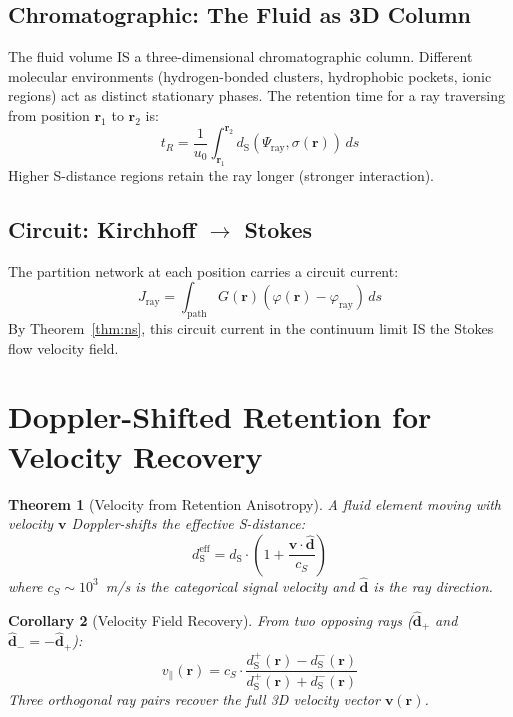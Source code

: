\documentclass[twocolumn,10pt,a4paper]{article}
\theoremstyle{plain}
\newtheorem{theorem}{Theorem}[section]
\newtheorem{corollary}[theorem]{Corollary}
\theoremstyle{definition}
\theoremstyle{remark}
\newcommand{\dS}{d_{\mathrm{S}}}
\begin{document}
\subsection{Chromatographic: The Fluid as 3D Column}

The fluid volume IS a three-dimensional chromatographic column. Different molecular environments (hydrogen-bonded clusters, hydrophobic pockets, ionic regions) act as distinct stationary phases. The retention time for a ray traversing from position $\mathbf{r}_1$ to $\mathbf{r}_2$ is:
\begin{equation}
    t_R = \frac{1}{u_0}\int_{\mathbf{r}_1}^{\mathbf{r}_2} \dS(\Psi_{\mathrm{ray}}, \sigma(\mathbf{r}))\, ds
\end{equation}
Higher S-distance regions retain the ray longer (stronger interaction).

\subsection{Circuit: Kirchhoff $\to$ Stokes}

The partition network at each position carries a circuit current:
\begin{equation}
    J_{\mathrm{ray}} = \int_{\mathrm{path}} G(\mathbf{r})(\varphi(\mathbf{r}) - \varphi_{\mathrm{ray}})\, ds
\end{equation}
By Theorem~\ref{thm:ns}, this circuit current in the continuum limit IS the Stokes flow velocity field.

\section{Doppler-Shifted Retention for Velocity Recovery}
\label{sec:doppler}

\begin{theorem}[Velocity from Retention Anisotropy]
\label{thm:doppler}
A fluid element moving with velocity $\mathbf{v}$ Doppler-shifts the effective S-distance:
\begin{equation}
    \dS^{\mathrm{eff}} = \dS \cdot \left(1 + \frac{\mathbf{v} \cdot \hat{\mathbf{d}}}{c_S}\right)
\end{equation}
where $c_S \sim 10^3$~m/s is the categorical signal velocity and $\hat{\mathbf{d}}$ is the ray direction.
\end{theorem}

\begin{corollary}[Velocity Field Recovery]
From two opposing rays ($\hat{\mathbf{d}}_+$ and $\hat{\mathbf{d}}_- = -\hat{\mathbf{d}}_+$):
\begin{equation}
    v_\parallel(\mathbf{r}) = c_S \cdot \frac{\dS^+(\mathbf{r}) - \dS^-(\mathbf{r})}{\dS^+(\mathbf{r}) + \dS^-(\mathbf{r})}
\end{equation}
Three orthogonal ray pairs recover the full 3D velocity vector $\mathbf{v}(\mathbf{r})$.
\end{corollary}
\end{document}
